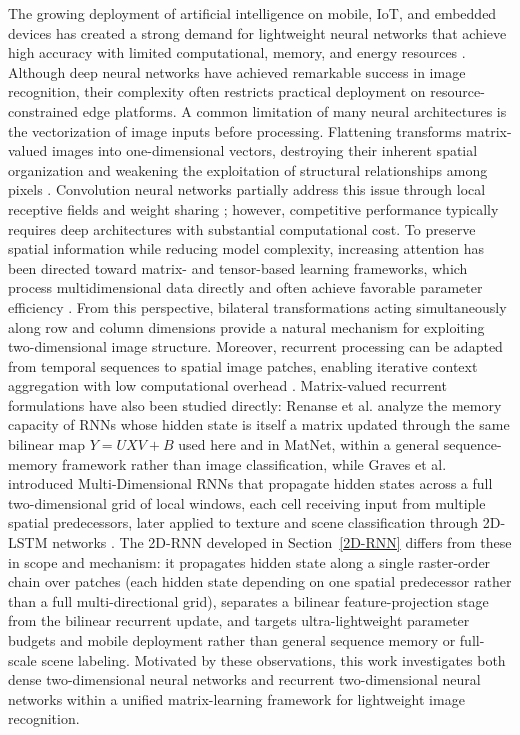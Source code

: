 \documentclass[pdflatex,sn-mathphys-num]{sn-jnl}%
\theoremstyle{thmstyleone}%
\theoremstyle{thmstyletwo}%
\theoremstyle{thmstylethree}%
\begin{document}
 The growing deployment of artificial intelligence on mobile, IoT, and embedded devices has created a strong demand for lightweight neural networks that achieve high accuracy with limited computational, memory, and energy resources \cite{Han2015, Howard2017, Sandler2018, Tan2019}. Although deep neural networks have achieved remarkable success in image recognition, their complexity often restricts practical deployment on resource-constrained edge platforms. A common limitation of many neural architectures is the vectorization of image inputs before processing. Flattening transforms matrix-valued images into one-dimensional vectors, destroying their inherent spatial organization and weakening the exploitation of structural relationships among pixels \cite{LeCun1998, Kolda2009}. Convolution neural networks partially address this issue through local receptive fields and weight sharing \cite{LeCun1998, Krizhevsky2012}; however, competitive performance typically requires deep architectures with substantial computational cost. To preserve spatial information while reducing model complexity, increasing attention has been directed toward matrix- and tensor-based learning frameworks, which process multidimensional data directly and often achieve favorable parameter efficiency \cite{Kolda2009, Novikov2015, Gao2017MatNet}. From this perspective, bilateral transformations acting simultaneously along row and column dimensions provide a natural mechanism for exploiting two-dimensional image structure. Moreover, recurrent processing can be adapted from temporal sequences to spatial image patches, enabling iterative context aggregation with low computational overhead \cite{Hochreiter1997, Graves2006}. Matrix-valued recurrent formulations have also been studied directly: Renanse et al. \cite{Renanse2023} analyze the memory capacity of RNNs whose hidden state is itself a matrix updated through the same bilinear map $Y=UXV+B$ used here and in MatNet, within a general sequence-memory framework rather than image classification, while Graves et al. \cite{Graves2007MDRNN} introduced Multi-Dimensional RNNs that propagate hidden states across a full two-dimensional grid of local windows, each cell receiving input from multiple spatial predecessors, later applied to texture and scene classification through 2D-LSTM networks \cite{Byeon2014}. The 2D-RNN developed in Section~\ref{2D-RNN} differs from these in scope and mechanism: it propagates hidden state along a single raster-order chain over patches (each hidden state depending on one spatial predecessor rather than a full multi-directional grid), separates a bilinear feature-projection stage from the bilinear recurrent update, and targets ultra-lightweight parameter budgets and mobile deployment rather than general sequence memory or full-scale scene labeling. Motivated by these observations, this work investigates both dense two-dimensional neural networks and recurrent two-dimensional neural networks within a unified matrix-learning framework for lightweight image recognition.
\end{document}
